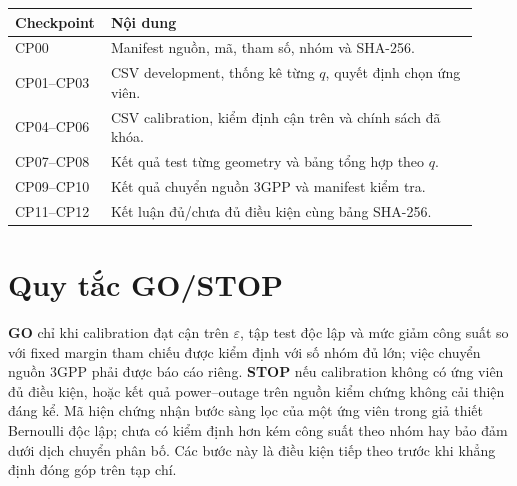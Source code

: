 \documentclass[11pt,onecolumn]{IEEEtran}
\begin{document}
\begin{longtable}{p{0.15\linewidth}p{0.77\linewidth}}
\toprule Checkpoint & Nội dung\\ \midrule
CP00 & Manifest nguồn, mã, tham số, nhóm và SHA-256.\\
CP01--CP03 & CSV development, thống kê từng $q$, quyết định chọn ứng viên.\\
CP04--CP06 & CSV calibration, kiểm định cận trên và chính sách đã khóa.\\
CP07--CP08 & Kết quả test từng geometry và bảng tổng hợp theo $q$.\\
CP09--CP10 & Kết quả chuyển nguồn 3GPP và manifest kiểm tra.\\
CP11--CP12 & Kết luận đủ/chưa đủ điều kiện cùng bảng SHA-256.\\ \bottomrule
\end{longtable}

\section{Quy tắc GO/STOP}
\textbf{GO} chỉ khi calibration đạt cận trên $\varepsilon$, tập test độc lập và mức giảm công suất so với fixed margin tham chiếu được kiểm định với số nhóm đủ lớn; việc chuyển nguồn 3GPP phải được báo cáo riêng. \textbf{STOP} nếu calibration không có ứng viên đủ điều kiện, hoặc kết quả power--outage trên nguồn kiểm chứng không cải thiện đáng kể. Mã hiện chứng nhận bước sàng lọc của một ứng viên trong giả thiết Bernoulli độc lập; chưa có kiểm định hơn kém công suất theo nhóm hay bảo đảm dưới dịch chuyển phân bố. Các bước này là điều kiện tiếp theo trước khi khẳng định đóng góp trên tạp chí.
\end{document}
